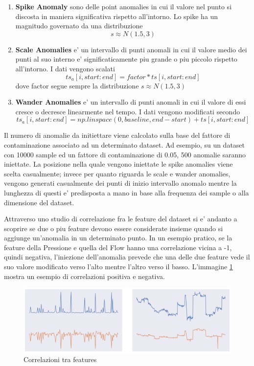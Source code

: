 \begin{enumerate}
	\item \textbf{Spike Anomaly} sono delle point anomalies in cui il valore nel punto si discosta in maniera significativa rispetto all'intorno. Lo spike ha un magnitudo governato da una distribuzione \[s \approx N(1.5, 3) \]
	\item \textbf{Scale Anomalies} e' un intervallo di punti anomali in cui il  valore medio dei punti al suo interno e' significaticamente piu grande o piu piccolo rispetto all'intorno. I dati vengono scalati \[ ts_a[i, start:end] = factor*ts[i, start:end]\] dove factor segue sempre la distribuzione \(s \approx N(1.5, 3) \)
	\item \textbf{Wander Anomalies} e' un intervallo di punti anomali in cui il valore di essi cresce o decresce linearmente nel tempo. I dati vengono modificati secondo \[ ts_a[i, start:end] = np.linspace(0, baseline, end-start) + ts[i, start:end] \] 
\end{enumerate}

Il numero di anomalie da initiettare viene calcolato sulla base del fattore di contaminazione associato ad un determinato dataset. Ad esempio, su un dataset con 10000 sample ed un fattore di contaminazione di 0.05, 500 anomalie saranno iniettate.
La posizione nella quale vengono iniettate le spike anomalies viene scelta casualmente; invece per quanto riguarda le scale e wander anomalies, vengono generati casualmente dei punti di inizio intervallo anomalo mentre la lunghezza di questi e' predisposta a mano in base alla frequenza dei sample o alla dimensione del dataset.

Attraverso uno studio di correlazione fra le feature del dataset si e' andanto a scoprire se due o piu feature devono essere considerate insieme quando si aggiunge un'anomalia in un determinato punto. In un esempio pratico, se la feature della Pressione e quella del Flow hanno una correlazione vicina a -1, quindi negativa, l'iniezione dell'anomalia prevede che una delle due feature vede il suo valore modificato verso l'alto mentre l'altro verso il basso. L'immagine \ref{feature-correlazioni} mostra un esempio di correlazioni positiva e negativa.
\begin{figure}[t]
\centering
	\includegraphics[width=14cm, scale=1]{images/corr}
    \caption{Correlazioni tra features}
	\label{feature-correlazioni}
	
\end{figure}

